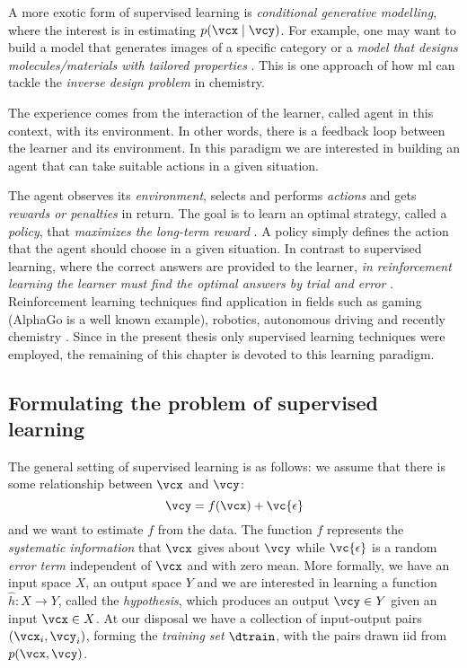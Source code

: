 A more exotic form of supervised learning is \emph{conditional generative
modelling}, where the interest is in
estimating $p(\vcx \mid \vcy)$. For example, one may want to build a model that
generates images of a specific category or a \emph{model that designs
molecules/materials with tailored properties} \parencite{Kim2018, Yao2021,
Gebauer2022}. This is one approach of how \gls{ml} can tackle the \emph{inverse
design problem} in chemistry.

\begin{definition}
	The experience comes from the interaction of the learner, called
	agent in this context, with its environment. In other words,
	there is a feedback loop between the learner and its environment. In this
	paradigm we are interested in building an agent that can take suitable
	actions in a given situation.
\end{definition}

The agent observes its \emph{environment}, selects and performs \emph{actions}
and gets \emph{rewards or penalties} in return. The goal is to learn an optimal
strategy, called a \emph{policy}, that \emph{maximizes the long-term reward}
\parencite{ml}. A policy simply defines the action that the agent should
choose in a given situation. In contrast to supervised learning, where the
correct answers are provided to the learner, \emph{in reinforcement learning the
learner must find the optimal answers by trial and error}
\parencite{bishop2007}. Reinforcement learning techniques find application in
fields such as gaming (AlphaGo is a well known example), robotics, autonomous
driving and recently chemistry \parencite{li, Gow2022}. Since in the present
thesis only supervised learning techniques were employed, the remaining of this
chapter is devoted to this learning paradigm.

\subsection{Formulating the problem of supervised learning}

The general setting of supervised learning is as follows: we assume that there
is some relationship between $\vcx$ and $\vcy$:
\begin{equation}
	\label{eq:supervised}
	\vcy = f(\vcx) + \vc{\epsilon}
\end{equation}
and we want to estimate $f$ from the data. The function $f$ represents the
\emph{systematic information} that $\vcx$ gives about $\vcy$ while
$\vc{\epsilon}$ is a random \emph{error term} independent of
$\vcx$ and with zero mean. More formally, we have an input space $X$, an output
space $Y$ and we are interested in learning a function $\hat{h} \colon X \to Y$,
called the \emph{hypothesis}, which produces
an output $\vcy \in Y$ given an input $\vcx \in X$. At our disposal we have a
collection of input-output pairs $(\vcx_i, \vcy_i)$, forming the \emph{training
set} $\dtrain$, with the pairs drawn \acrshort{iid} from
$p(\vcx, \vcy)$.

